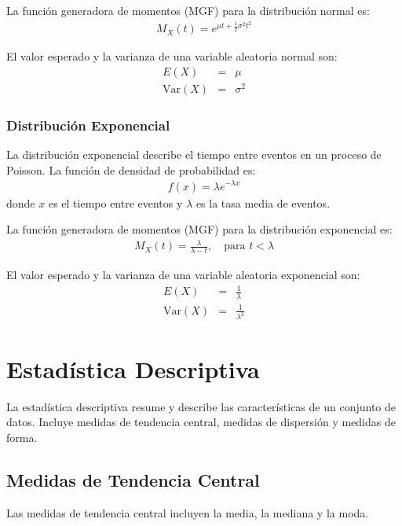 \documentclass[a4paper]{report} %
\begin{document}
La funci\'on generadora de momentos (MGF) para la distribuci\'on normal es:
\begin{eqnarray*}
M_X(t) = e^{\mu t + \frac{1}{2} \sigma^2 t^2}
\end{eqnarray*}

El valor esperado y la varianza de una variable aleatoria normal son:
\begin{eqnarray*}
E(X) &=& \mu \\
\text{Var}(X) &=& \sigma^2
\end{eqnarray*}

\subsubsection{Distribuci\'on Exponencial}

La distribuci\'on exponencial describe el tiempo entre eventos en un proceso de Poisson. La funci\'on de densidad de probabilidad es:
\begin{eqnarray*}
f(x) = \lambda e^{-\lambda x}
\end{eqnarray*}
donde $x$ es el tiempo entre eventos y $\lambda$ es la tasa media de eventos.

La funci\'on generadora de momentos (MGF) para la distribuci\'on exponencial es:
\begin{eqnarray*}
M_X(t) = \frac{\lambda}{\lambda - t}, \quad \text{para } t < \lambda
\end{eqnarray*}

El valor esperado y la varianza de una variable aleatoria exponencial son:
\begin{eqnarray*}
E(X) &=& \frac{1}{\lambda} \\
\text{Var}(X) &=& \frac{1}{\lambda^2}
\end{eqnarray*}

\section{Estad\'istica Descriptiva}

La estad\'istica descriptiva resume y describe las caracter\'isticas de un conjunto de datos. Incluye medidas de tendencia central, medidas de dispersi\'on y medidas de forma.

\subsection{Medidas de Tendencia Central}

Las medidas de tendencia central incluyen la media, la mediana y la moda.
\end{document}
